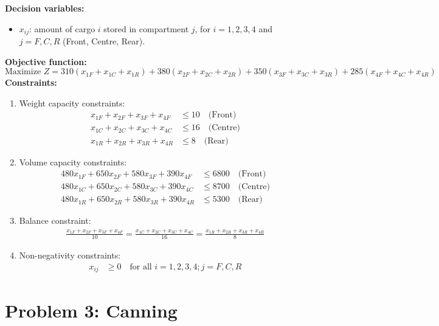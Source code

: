 \documentclass[a4paper,10pt]{article}
\begin{document}
\textbf{Decision variables:}
\begin{itemize}
    \item $x_{ij}$: amount of cargo $i$ stored in compartment $j$, for $i=1,2,3,4$ and $j=F,C,R$ (Front, Centre, Rear).
\end{itemize}
\textbf{Objective function:}
\begin{equation*}
    \text{Maximize } Z = 310(x_{1F} + x_{1C} + x_{1R}) + 380(x_{2F} + x_{2C} + x_{2R}) + 350(x_{3F} + x_{3C} + x_{3R}) + 285(x_{4F} + x_{4C} + x_{4R})
\end{equation*}
\textbf{Constraints:}
\begin{enumerate}
    \item Weight capacity constraints:
    \begin{align*}
        x_{1F} + x_{2F} + x_{3F} + x_{4F} &\leq 10 \quad \text{(Front)} \\
        x_{1C} + x_{2C} + x_{3C} + x_{4C} &\leq 16 \quad \text{(Centre)} \\
        x_{1R} + x_{2R} + x_{3R} + x_{4R} &\leq 8 \quad \text{(Rear)}
    \end{align*}
    
    \item Volume capacity constraints:
    \begin{align*}
        480x_{1F} + 650x_{2F} + 580x_{3F} + 390x_{4F} &\leq 6800 \quad \text{(Front)} \\
        480x_{1C} + 650x_{2C} + 580x_{3C} + 390x_{4C} &\leq 8700 \quad \text{(Centre)} \\
        480x_{1R} + 650x_{2R} + 580x_{3R} + 390x_{4R} &\leq 5300 \quad \text{(Rear)}
    \end{align*}
    
    \item Balance constraint:
    \begin{align*}
        \frac{x_{1F} + x_{2F} + x_{3F} + x_{4F}}{10} = \frac{x_{1C} + x_{2C} + x_{3C} + x_{4C}}{16} = \frac{x_{1R} + x_{2R} + x_{3R} + x_{4R}}{8}
    \end{align*}
    
    \item Non-negativity constraints:
    \begin{align*}
        x_{ij} &\geq 0 \quad \text{for all } i=1,2,3,4; j=F,C,R
    \end{align*}
\end{enumerate}

\newpage
\section*{Problem 3: Canning}
\end{document}

